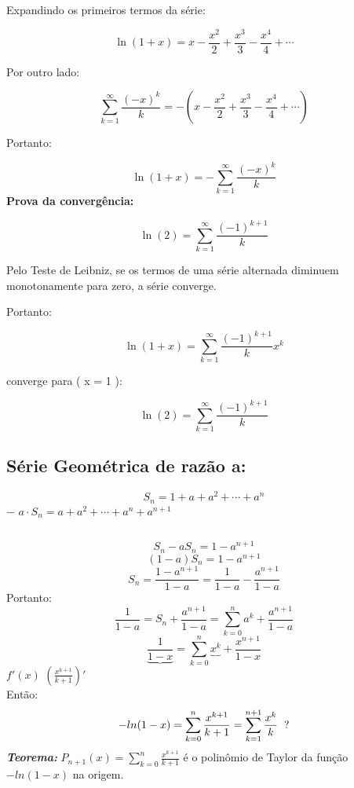 \documentclass[12pt]{article}
\begin{document}
Expandindo os primeiros termos da série:

\[\ln(1+x) = x - \frac{x^2}{2} + \frac{x^3}{3} - \frac{x^4}{4} + \cdots \]

Por outro lado:

\[\sum_{k=1}^{\infty} \frac{(-x)^k}{k} = -\left( x - \frac{x^2}{2} + \frac{x^3}{3} - \frac{x^4}{4} + \cdots \right)\]

Portanto:

\[\ln(1+x) = -\sum_{k=1}^{\infty} \frac{(-x)^k}{k}\]
\newpage
\textbf{Prova da convergência:}

\[ \ln(2) = \sum_{k=1}^{\infty} \frac{(-1)^{k+1}}{k} \]

Pelo Teste de Leibniz, se os termos de uma série alternada diminuem monotonamente para zero, a série converge.

Portanto:

\[ \ln(1+x) = \sum_{k=1}^{\infty} \frac{(-1)^{k+1}}{k} x^k \]

converge para ( x = 1 ):

\[ \ln(2) = \sum_{k=1}^{\infty} \frac{(-1)^{k+1}}{k} \]
\newpage
\subsection{Série Geométrica de razão a:}
\[S_{n}=1+a+a^2+\cdots+a^{n}\]
\hspace{3cm} \(-\) \hspace{0.5cm} \(a\cdot S_{n}=a+a^2+\cdots+a^{n}+a^{n+1}\)

\vspace{-0.8cm}
\begin{center}\(\)
    


\end{center}
\vspace{-0.6cm}
\[S_n-aS_n=1-a^{n+1}\]
\[(1-a)S_n=1-a^{n+1}\]
\[S_n=\frac{1-a^{n+1}}{1-a}=\frac{1}{1-a}-\frac{a^{n+1}}{1-a}\]
Portanto:
\[\frac{1}{1-a}=S_n+\frac{a^{n+1}}{1-a}=\sum_{k=0}^{n}a^k+\frac{a^{n+1}}{1-a}\]
\[\underbrace{\frac{1}{1-x}}=\sum_{k=0}^{n}\underbrace{x^k}+\frac{x^{n+1}}{1-x}\]
\hspace{4.5cm} \large{\(f'(x)\)} \hspace{0.4cm} \Large{\(\left(\frac{x^{k+1}}{k+1}\right)'\)}\\
\normalsize{Então:}
\[-ln(1-x)=\sum_{k=0}^{n}\frac{x^{k+1}}{k+1}=\sum_{k=1}^{n+1}\frac{x^k}{k}\hspace{0.2cm}?\]
\textbf{\textit{Teorema:}} \(P_{n+1}(x)=\sum_{k=0}^{n}\frac{x^{k+1}}{k+1}\) é o polinômio de Taylor da função \(-ln(1-x)\) na origem.\\
\end{document}
